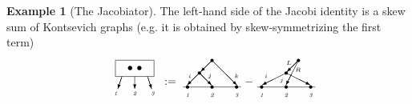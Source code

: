 \documentclass[a4paper]{jpconf}%
\theoremstyle{definition}
\newtheorem{example}{Example}%
\theoremstyle{remark}
\newcommand*{\vcenteredhbox}[1]{\begingroup
\setbox0=\hbox{#1}\parbox{\wd0}{\box0}\endgroup}
\begin{document}
\begin{example}[The Jacobiator]
The left-hand side of the Jacobi identity is a skew sum of Kontsevich graphs (e.g. it is obtained by skew-symmetrizing the first term)
\begin{equation}\label{EqJacFig}
\vcenteredhbox{
\raisebox{3.3mm}%
[6.5mm][3.5mm]{
\unitlength=1mm
\special{em:linewidth 0.4pt}
\linethickness{0.4pt}
\begin{picture}(12,15)
\put(0,-10){
\begin{picture}(12.00,15.00)
\put(0.00,10.00){\framebox(12.00,5.00)[cc]{$\bullet\ \bullet$}}
\put(2.00,10.00){\vector(-1,-3){1.33}}
\put(6.00,10.00){\vector(0,-1){4.00}}
\put(10.00,10.00){\vector(1,-3){1.33}}
\put(0.00,4.00){\makebox(0,0)[cb]{\tiny\it1}}
\put(6.00,4.00){\makebox(0,0)[cb]{\tiny\it2}}
\put(11.67,4.00){\makebox(0,0)[cb]{\tiny\it3}}
\end{picture}
}\end{picture}}}\ \ \ 
\mathrel{{:}{=}}
\text{\raisebox{-12pt}[25pt]{
%
\unitlength=0.70mm
\linethickness{0.4pt}
\begin{picture}(26.00,16.33)
\put(0.00,5.00){\line(1,0){26.00}}
\put(2.00,5.00){\circle*{1.33}}
\put(13.00,5.00){\circle*{1.33}}
\put(24.00,5.00){\circle*{1.33}}
\put(2.00,1.33){\makebox(0,0)[cc]{\tiny\it1}}
\put(13.00,1.33){\makebox(0,0)[cc]{\tiny\it2}}
\put(24.00,1.33){\makebox(0,0)[cc]{\tiny\it3}}
\put(7.33,11.33){\circle*{1.33}}
\put(7.33,11.33){\vector(1,-1){5.5}}
\put(7.33,11.33){\vector(-1,-1){5.5}}
\put(13,17){\circle*{1.33}}
\put(13,17){\vector(1,-1){11.2}}
\put(13,17){\vector(-1,-1){5.1}}
\put(3.00,10.00){\makebox(0,0)[cc]{\tiny$i$}}
\put(12.00,10.00){\makebox(0,0)[cc]{\tiny$j$}}
\put(24.00,10.00){\makebox(0,0)[cc]{\tiny$k$}}
\end{picture}
}}
{-}
\text{\raisebox{-12pt}[25pt]{
%
\unitlength=0.70mm
\linethickness{0.4pt}
\begin{picture}(26.00,16.33)
\put(0.00,5.00){\line(1,0){26.00}}
\put(2.00,5.00){\circle*{1.33}}
\put(13.00,5.00){\circle*{1.33}}
\put(24.00,5.00){\circle*{1.33}}
\put(2.00,1.33){\makebox(0,0)[cc]{\tiny\it1}}
\put(13.00,1.33){\makebox(0,0)[cc]{\tiny\it2}}
\put(24.00,1.33){\makebox(0,0)[cc]{\tiny\it3}}
\put(13,11.33){\circle*{1.33}}
\put(13,11.33){\vector(2,-1){10.8}}
\put(13,11.33){\vector(-2,-1){10.8}}
\put(18.5,17){\circle*{1.33}}
\put(18.5,17){\vector(-1,-1){5.2}}
\put(18.5,17){\vector(-1,-2){5.6}}
\put(13,15){\tiny $L$}
\put(17,12){\tiny $R$}
\put(4.00,10.00){\makebox(0,0)[cc]{\tiny$i$}}
\put(11.00,8.00){\makebox(0,0)[cc]{\tiny$j$}}

\end{picture}}}
\end{equation}
\end{example}
\end{document}
